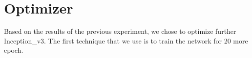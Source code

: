 \section{Optimizer}
Based on the results of the previous experiment, we chose to optimize further Inception\_v3. 
The first technique that we use is to train the network for 20 more epoch. 